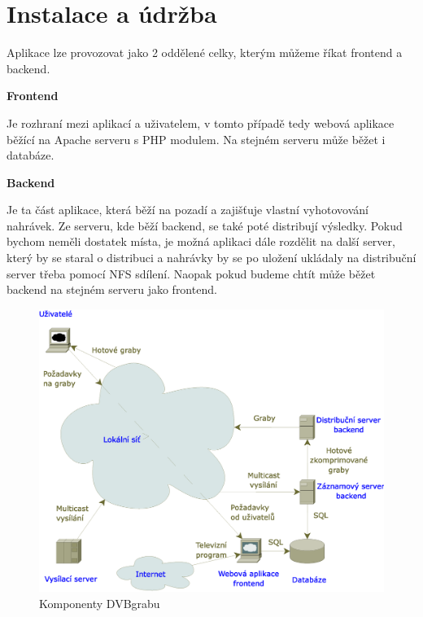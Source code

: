 \chapter{Instalace a údržba}

\vspace{10pt}

Aplikace lze provozovat jako 2 oddělené celky, kterým můžeme říkat frontend a backend.

\vspace{10pt}

\textbf{Frontend}

Je rozhraní mezi aplikací a uživatelem, v tomto případě tedy webová aplikace běžící na Apache serveru s PHP modulem. Na stejném serveru může běžet i databáze.

\vspace{10pt}

\textbf{Backend}

Je ta část aplikace, která běží na pozadí a zajišťuje vlastní vyhotovování nahrávek. Ze serveru, kde běží backend, se také poté distribují výsledky. Pokud bychom neměli dostatek místa, je možná aplikaci dále rozdělit na další server, který by se staral o distribuci a nahrávky by se po uložení ukládaly na distribuční server třeba pomocí NFS sdílení. Naopak pokud budeme chtít může běžet backend na stejném serveru jako frontend.

\vspace{10pt}

\begin{figure}[ht]
\begin{center}
\includegraphics[width=15cm]{images/dvbgrab.eps}
\caption{Komponenty DVBgrabu}
\label{fig:dvbgrab}
\end{center}
\end{figure}

